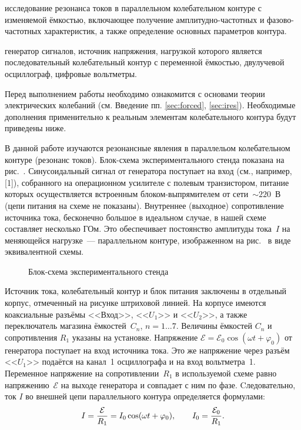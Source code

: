 
\begin{lab:aim}
	исследование резонанса токов в параллельном колебательном контуре с
изменяемой ёмкостью, включающее получение амплитудно-частотных и
фазово-частотных характеристик, а также определение основных параметров контура.
\end{lab:aim}

\begin{lab:equipment}
	генератор сигналов, источник напряжения, нагрузкой которого является
последовательный колебательный контур с переменной ёмкостью, двулучевой
осциллограф, цифровые вольтметры.
\end{lab:equipment}

Перед выполнением работы необходимо ознакомится с основами теории электрических  
колебаний (см. Введение пп. \ref{sec:forced}, \ref{sec:ires}).
Необходимые дополнения применительно к реальным элементам колебательного
контура будут приведены ниже.

\experiment
В данной работе изучаются резонансные явления в параллельом колебательном
контуре (резонанс токов). Блок-схема экспериментального стенда 
показана на рис.~. Синусоидальный сигнал
от генератора поступает на вход  (см., например, [1]), собранного на операционном усилителе с полевым
транзистором, питание которых осуществляется встроенным блоком-выпрямителем от
сети~$\sim220$~В (цепи питания на схеме не показаны).  Внутреннее (выходное)
сопротивление источника тока, бесконечно большое в идеальном случае, в нашей
схеме составляет несколько ГОм. Это обеспечивает постоянство амплитуды тока~$I$
на меняющейся нагрузке~--- параллельном контуре, изображенном на 
рис.~ в виде эквивалентной схемы.

\begin{figure}[h!]
    \centering
	\caption{Блок-схема экспериментального стенда}
\end{figure}


Источник тока, колебательный контур и блок питания заключены в отдельный корпус,
отмеченный на рисунке штриховой линией. 
На корпусе имеются коаксиальные разъёмы <<Вход>>,
<<${U}_1$>> и <<${U}_2$>>, а также переключатель магазина ёмкостей~$C_n$,
$n=1\ldots7$. Величины ёмкостей $C_n$ и сопротивления $R_1$ указаны на установке.
Напряжение $\mathcal{E}=\mathcal{E}_0\cos(\omega t+\varphi_0)$ от генератора поступает на
вход источника тока. Это же напряжение через разъём <<${U}_1$>> подаётся на
канал~1 осциллографа и на вход вольтметра~1. Переменное напряжение на
сопротивлении~$R_1$ в используемой схеме равно напряжению~$\mathcal{E}$ 
на выходе генератора и совпадает с ним по фазе. 
Cледовательно, ток $I$ во внешней цепи параллельного контура 
определяется формулами:
\begin{equation}\eqmark{2.3.1}
	I=\frac{\mathcal{E}}{R_1}=I_0\cos(\omega t+\varphi_0), \qquad 
    I_0=\frac{\mathcal{E}_0}{R_1}.
\end{equation}

